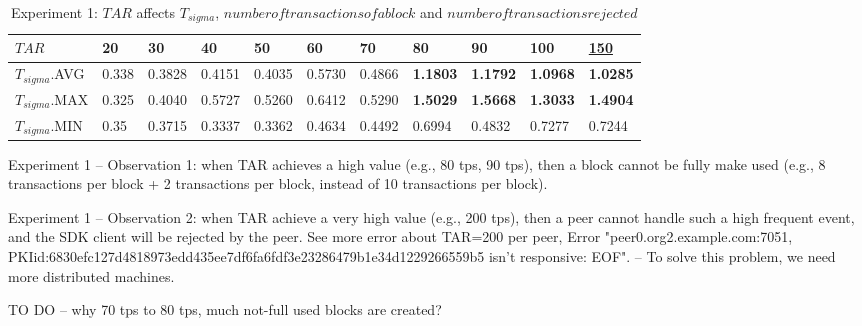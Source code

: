 \documentclass[10pt,journal,compsoc, twoside]{IEEEtran}
\begin{document}
\begin{table*}[htbp]
	\caption{Experiment 1: $TAR$ affects $T_{sigma}$, $number of transactions of a block$ and $number of transactions rejected$}
	\begin{tabular}{|l|l|l|l|l|l|l|l|l|l|l|}
		\hline
		$TAR$           & 20    & 30     & 40     & 50     & 60     & 70     & 80              & 90              & 100             & \underline{150 }      \\ \hline
		$T_{sigma}$.AVG & 0.338 & 0.3828 & 0.4151 & 0.4035 & 0.5730 & 0.4866 & \textbf{1.1803} & \textbf{1.1792} & \textbf{1.0968} & \textbf{1.0285} \\ \hline
		$T_{sigma}$.MAX & 0.325 & 0.4040 & 0.5727 & 0.5260 & 0.6412 & 0.5290 & \textbf{1.5029} & \textbf{1.5668} & \textbf{1.3033} & \textbf{1.4904} \\ \hline
		$T_{sigma}$.MIN & 0.35  & 0.3715 & 0.3337 & 0.3362 & 0.4634 & 0.4492 & 0.6994          & 0.4832          & 0.7277          & 0.7244          \\ \hline
	\end{tabular}
\end{table*}


Experiment 1 -- Observation 1: when TAR achieves a high value (e.g., 80 tps, 90 tps), then a block cannot be fully make used (e.g., 8 transactions per block + 2 transactions per block, instead of 10 transactions per block).

Experiment 1 -- Observation 2: when TAR achieve a very high value (e.g., 200 tps), then a peer cannot handle such a high frequent event, and the SDK client will be rejected by the peer. See more error about TAR=200 per peer, Error "peer0.org2.example.com:7051, PKIid:6830efc127d4818973edd435ee7df6fa6fdf3e23286479b1e34d1229266559b5 isn't responsive: EOF". -- To solve this problem, we need more distributed machines.

TO DO -- why 70 tps to 80 tps, much not-full used blocks are created?
\end{document}
